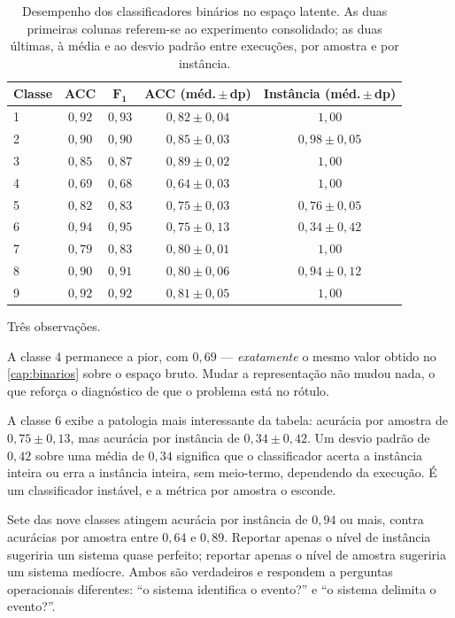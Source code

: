 \begin{table}[htbp]
\centering
\caption{Desempenho dos classificadores binários no espaço latente. As duas primeiras
colunas referem-se ao experimento consolidado; as duas últimas, à média e ao desvio
padrão entre execuções, por amostra e por instância.}
\label{tab:aberto-binarios}
\small
\begin{tabular}{lcccc}
\toprule
\textbf{Classe} & \textbf{ACC} & $\bm{F_1}$ & \textbf{ACC (méd.\,$\pm$\,dp)} &
\textbf{Instância (méd.\,$\pm$\,dp)} \\
\midrule
1 & $0{,}92$ & $0{,}93$ & $0{,}82 \pm 0{,}04$ & $1{,}00$ \\
2 & $0{,}90$ & $0{,}90$ & $0{,}85 \pm 0{,}03$ & $0{,}98 \pm 0{,}05$ \\
3 & $0{,}85$ & $0{,}87$ & $0{,}89 \pm 0{,}02$ & $1{,}00$ \\
4 & $0{,}69$ & $0{,}68$ & $0{,}64 \pm 0{,}03$ & $1{,}00$ \\
5 & $0{,}82$ & $0{,}83$ & $0{,}75 \pm 0{,}03$ & $0{,}76 \pm 0{,}05$ \\
6 & $0{,}94$ & $0{,}95$ & $0{,}75 \pm 0{,}13$ & $0{,}34 \pm 0{,}42$ \\
7 & $0{,}79$ & $0{,}83$ & $0{,}80 \pm 0{,}01$ & $1{,}00$ \\
8 & $0{,}90$ & $0{,}91$ & $0{,}80 \pm 0{,}06$ & $0{,}94 \pm 0{,}12$ \\
9 & $0{,}92$ & $0{,}92$ & $0{,}81 \pm 0{,}05$ & $1{,}00$ \\
\bottomrule
\end{tabular}
\end{table}

Três observações.

A classe 4 permanece a pior, com $0{,}69$ --- \emph{exatamente} o mesmo valor obtido no
\cref{cap:binarios} sobre o espaço bruto. Mudar a representação não mudou nada, o que
reforça o diagnóstico de que o problema está no rótulo.

A classe 6 exibe a patologia mais interessante da tabela: acurácia por amostra de
$0{,}75 \pm 0{,}13$, mas acurácia por instância de $0{,}34 \pm 0{,}42$. Um desvio padrão
de $0{,}42$ sobre uma média de $0{,}34$ significa que o classificador acerta a instância
inteira ou erra a instância inteira, sem meio-termo, dependendo da execução. É um
classificador instável, e a métrica por amostra o esconde.

\begin{destaque}
Sete das nove classes atingem acurácia por instância de $0{,}94$ ou mais, contra
acurácias por amostra entre $0{,}64$ e $0{,}89$. Reportar apenas o nível de instância
sugeriria um sistema quase perfeito; reportar apenas o nível de amostra sugeriria um
sistema medíocre. Ambos são verdadeiros e respondem a perguntas operacionais
diferentes: ``o sistema identifica o evento?'' e ``o sistema delimita o evento?''.
\end{destaque}

